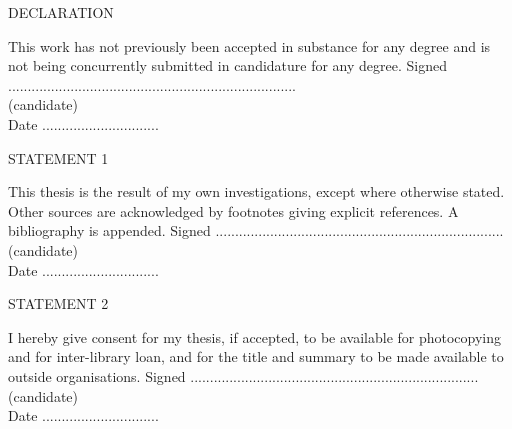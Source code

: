 \begin{titlepage}
\newpage
\noindent
\begin{Large}
\noindent
DECLARATION\\
\end{Large}
\newline	
This work has not previously been accepted in substance for any degree and is not being concurrently submitted in candidature for any degree.	
\newline
\newline
Signed ..........................................................................\\
(candidate)	\\
\newline
Date ..............................\\
\newline
\newline
\begin{large}
\noindent
STATEMENT 1\\
\end{large}
\newline
This thesis is the result of my own investigations, except where otherwise stated. Other sources are acknowledged by footnotes giving explicit references.  A bibliography is appended.
\newline
\newline
Signed ..........................................................................\\
(candidate)	\\
\newline
Date ..............................\\
\newline
\newline
\begin{large}
\noindent
STATEMENT 2	\\
\end{large}
\newline
I hereby give consent for my thesis, if accepted, to be available for photocopying and for inter-library loan, and for the title and summary to be made available to outside organisations.	
\newline
\newline
Signed ..........................................................................\\
(candidate)	\\
\newline
Date ..............................\\
\end{titlepage}
